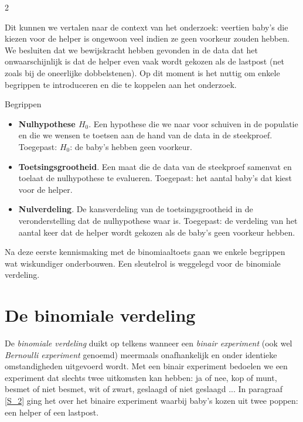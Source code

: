 \begin{multicols}{2}

Dit kunnen we vertalen naar de context van het onderzoek: veertien baby's die kiezen voor de helper is ongewoon veel indien ze geen voorkeur zouden hebben. We besluiten dat we bewijskracht hebben gevonden in de data dat het onwaarschijnlijk is dat de helper even vaak wordt gekozen als de lastpost (net zoals bij de oneerlijke dobbelstenen). Op dit moment is het nuttig om enkele begrippen te introduceren en die te koppelen aan het onderzoek. 

\begin{kader}{}{Begrippen}
\begin{itemize}
    \item \textbf{Nulhypothese $H_0$}. Een hypothese die we naar voor schuiven in de populatie en die we wensen te toetsen aan de hand van de data in de steekproef. Toegepast: $H_0$: de baby's hebben geen voorkeur. 
    \item \textbf{Toetsingsgrootheid}. Een maat die de data van de steekproef samenvat en toelaat de nulhypothese te evalueren. Toegepast: het aantal baby's dat kiest voor de helper. 
    \item \textbf{Nulverdeling}. De kansverdeling van de toetsingsgrootheid in de veronderstelling dat de nulhypothese waar is. Toegepast: de verdeling van het aantal keer dat de helper wordt gekozen als de baby's geen voorkeur hebben. 
\end{itemize}
\end{kader}

\columnbreak

Na deze eerste kennismaking met de binomiaaltoets gaan we enkele begrippen wat wiskundiger onderbouwen. Een sleutelrol is weggelegd voor de binomiale verdeling. 
	
    \section{De binomiale verdeling} \label{S_3}
     
    De \emph{binomiale verdeling} duikt op telkens wanneer een \emph{binair experiment} (ook wel \emph{Bernoulli experiment} genoemd) meermaals onafhankelijk en onder identieke omstandigheden uitgevoerd wordt. Met een binair experiment bedoelen we een experiment dat slechts twee uitkomsten kan hebben: ja of nee, kop of munt, besmet of niet besmet, wit of zwart, geslaagd of niet geslaagd ... In paragraaf \ref{S_2} ging het over het binaire experiment waarbij baby's kozen uit twee poppen: een helper of een lastpost.


\end{multicols}
